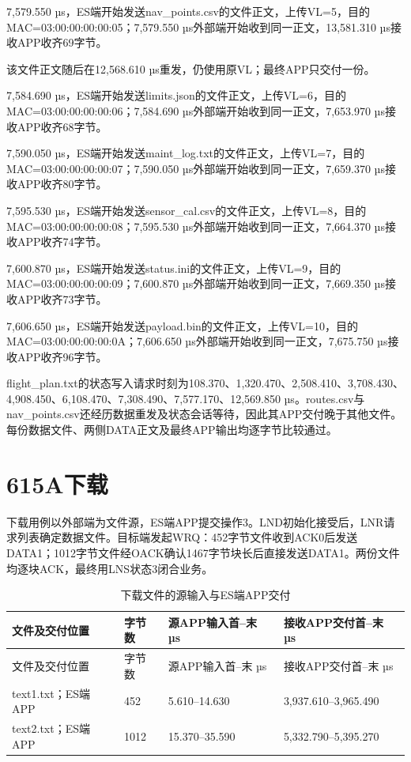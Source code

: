 7,579.550 µs，ES端开始发送nav\_points.csv的文件正文，上传VL=5，目的MAC=03:00:00:00:00:05；7,579.550 µs外部端开始收到同一正文，13,581.310 µs接收APP收齐69字节。

该文件正文随后在12,568.610 µs重发，仍使用原VL；最终APP只交付一份。

7,584.690 µs，ES端开始发送limits.json的文件正文，上传VL=6，目的MAC=03:00:00:00:00:06；7,584.690 µs外部端开始收到同一正文，7,653.970 µs接收APP收齐68字节。

7,590.050 µs，ES端开始发送maint\_log.txt的文件正文，上传VL=7，目的MAC=03:00:00:00:00:07；7,590.050 µs外部端开始收到同一正文，7,659.370 µs接收APP收齐80字节。

7,595.530 µs，ES端开始发送sensor\_cal.csv的文件正文，上传VL=8，目的MAC=03:00:00:00:00:08；7,595.530 µs外部端开始收到同一正文，7,664.370 µs接收APP收齐74字节。

7,600.870 µs，ES端开始发送status.ini的文件正文，上传VL=9，目的MAC=03:00:00:00:00:09；7,600.870 µs外部端开始收到同一正文，7,669.350 µs接收APP收齐73字节。

7,606.650 µs，ES端开始发送payload.bin的文件正文，上传VL=10，目的MAC=03:00:00:00:00:0A；7,606.650 µs外部端开始收到同一正文，7,675.750 µs接收APP收齐96字节。

flight\_plan.txt的状态写入请求时刻为108.370、1,320.470、2,508.410、3,708.430、4,908.450、6,108.470、7,308.490、7,577.170、12,569.850 µs。routes.csv与nav\_points.csv还经历数据重发及状态会话等待，因此其APP交付晚于其他文件。每份数据文件、两侧DATA正文及最终APP输出均逐字节比较通过。

\section{615A下载}

下载用例以外部端为文件源，ES端APP提交操作3。LND初始化接受后，LNR请求列表确定数据文件。目标端发起WRQ：452字节文件收到ACK0后发送DATA1；1012字节文件经OACK确认1467字节块长后直接发送DATA1。两份文件均逐块ACK，最终用LNS状态3闭合业务。

\begingroup\small\setlength{\tabcolsep}{3pt}
\begin{longtable}{@{}P{48mm}P{20mm}P{42mm}P{42mm}@{}}
\caption{下载文件的源输入与ES端APP交付}\\\toprule
文件及交付位置 & 字节数 & 源APP输入首--末 µs & 接收APP交付首--末 µs\\
\midrule\endfirsthead\toprule
文件及交付位置 & 字节数 & 源APP输入首--末 µs & 接收APP交付首--末 µs\\
\midrule\endhead
text1.txt；ES端APP & 452 & 5.610--14.630 & 3,937.610--3,965.490\\
text2.txt；ES端APP & 1012 & 15.370--35.590 & 5,332.790--5,395.270\\
\bottomrule\end{longtable}\endgroup


